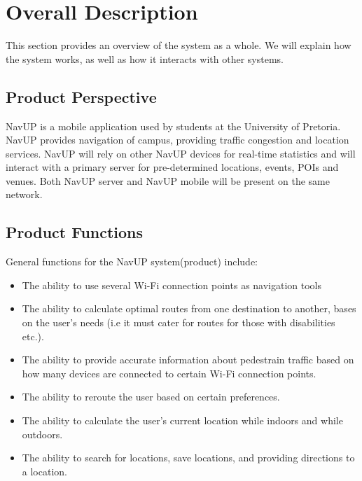 \documentclass{article}
\begin{document}
\section{Overall Description}

    \begin{flushleft}
        This section provides an overview of the system as a whole. We will explain how the system works, as well as how it interacts with other systems.
    \end{flushleft}
    
    
    \subsection{Product Perspective}
    
        NavUP is a mobile application used by students at the University of Pretoria. NavUP provides navigation of campus, providing traffic congestion and location services. NavUP will rely on other NavUP devices for real-time statistics and will interact with a primary server for pre-determined locations, events, POIs and venues. Both NavUP server and NavUP mobile will be present on the same network.
    \subsection{Product Functions}
		\begin{flushleft}
			General functions for the NavUP system(product) include:
			\begin{itemize}
   		 	\item The ability to use several Wi-Fi connection points as navigation tools
			 	\item The ability to calculate optimal routes from one destination to another, bases on the user's needs (i.e it must cater for routes for those with disabilities etc.).
			 	\item The ability to provide accurate information about pedestrain traffic based on how many devices are connected to certain Wi-Fi connection points.
				 \item The ability to reroute the user based on certain preferences.
				 \item The ability to calculate the user's current location while indoors and while outdoors.
				 \item The ability to search for locations, save locations, and providing directions to a location. 
			\end{itemize}
		\end{flushleft}
\end{document}
